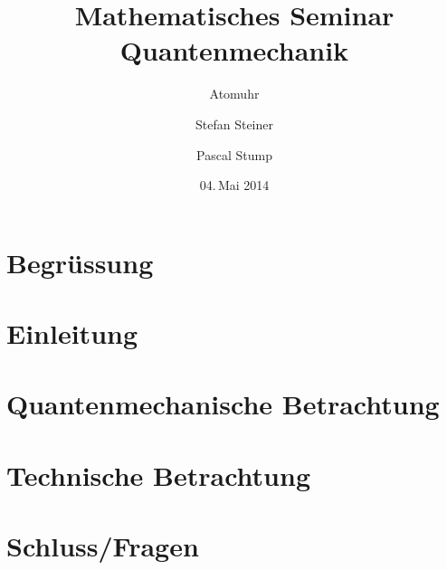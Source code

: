 \documentclass[compressd]
{beamer}
\title[MathSem QM]{Mathematisches Seminar Quantenmechanik}
\subtitle{Atomuhr}
\author{Stefan Steiner \and Pascal Stump}
\institute{HSR Hochschule für Technik Rapperswil}
\date{04.\,Mai 2014}
\begin{document}
	
	\begin{frame}
		\titlepage
	\end{frame}
	
	\section*{Begrüssung}
	
	
	\section{Einleitung}
	

		\section[Math]{Quantenmechanische Betrachtung}
	
	
	\section[Tech]{Technische Betrachtung}
	 
		
	\section[?]{ Schluss/Fragen}
	
	
\end{document}
